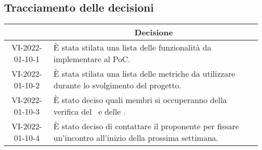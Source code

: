 \pagebreak

\subsection{Tracciamento delle decisioni}

\begin{table}[H]
	\centering
	\renewcommand{\arraystretch}{1.8}
	\begin{tabular}{c | p{10cm}}
		\rowcolor[HTML]{125E28}
		\multicolumn{1}{c}{\color[HTML]{FFFFFF} \textbf{ID}} &
		\multicolumn{1}{c}{\color[HTML]{FFFFFF} \textbf{Decisione}} \\
		\hline
		VI-2022-01-10-1 & È stata stilata una lista delle funzionalità da implementare al PoC\glo.\\ \hline
		VI-2022-01-10-2 & È stata stilata una lista delle metriche da utilizzare durante lo svolgimento del progetto.\\ \hline
		VI-2022-01-10-3 & È stato deciso quali membri si occuperanno della verifica del \docNamePdPLow\ e delle \docNameNdPLow.\\ \hline
		VI-2022-01-10-4 & È stato deciso di contattare il proponente per fissare un'incontro all'inizio della prossima settimana.\\ \hline
		
	\end{tabular}
\end{table}